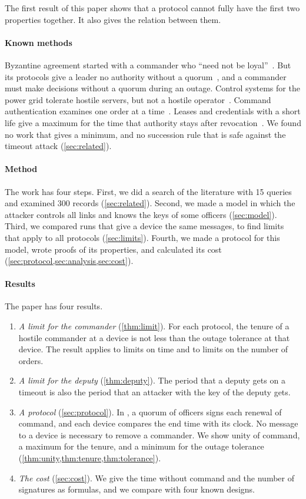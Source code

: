 The first result of this paper shows that a protocol cannot fully have
the first two properties together. It also gives the relation between them.

\paragraph{Known methods}
Byzantine agreement started with a commander who ``need not be
loyal''~\cite[p.~384]{lamport1982byzantine}. But its protocols give a leader no authority
without a quorum~\cite{castro1999pbft}, and a commander must make decisions without a quorum
during an outage. Control systems for the power grid tolerate hostile servers, but not a
hostile operator~\cite{babay2018spire}. Command authentication examines one order at a
time~\cite{mashima2019delaying}. Leases and credentials with a short life give a maximum for
the time that authority stays after revocation~\cite{gray1989leases,zhou2026hrcred}. We
found no work that gives a minimum, and no succession rule that is safe against the timeout
attack (\cref{sec:related}).

\paragraph{Method}
The work has four steps. First, we did a search of the literature with 15 queries and
examined 300 records (\cref{sec:related}). Second, we made a model in which the attacker
controls all links and knows the keys of some officers (\cref{sec:model}). Third, we
compared runs that give a device the same messages, to find limits that apply to all
protocols (\cref{sec:limits}). Fourth, we made a protocol for this model, wrote proofs of
its properties, and calculated its cost (\cref{sec:protocol,sec:analysis,sec:cost}).

\paragraph{Results}
The paper has four results.
\begin{enumerate}
  \item \emph{A limit for the commander} (\cref{thm:limit}). For each protocol, the tenure
  of a hostile commander at a device is not less than the outage tolerance at that device.
  The result applies to limits on time and to limits on the number of orders.
  \item \emph{A limit for the deputy} (\cref{thm:deputy}). The period that a deputy gets on
  a timeout is also the period that an attacker with the key of the deputy gets.
  \item \emph{A protocol} (\cref{sec:protocol}). In \sys{}, a quorum of officers signs each
  renewal of command, and each device compares the end time with its clock. No message to a
  device is necessary to remove a commander. We show unity of command, a maximum for the
  tenure, and a minimum for the outage tolerance
  (\cref{thm:unity,thm:tenure,thm:tolerance}).
  \item \emph{The cost} (\cref{sec:cost}). We give the time without command and the number
  of signatures as formulas, and we compare \sys{} with four known designs.
\end{enumerate}

